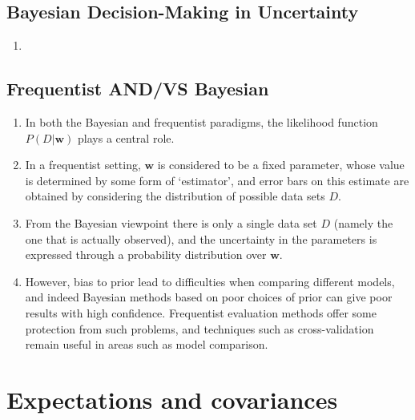 \subsection{Bayesian Decision-Making in Uncertainty}

\begin{enumerate}
    \item 
\end{enumerate}



\subsection{Frequentist AND/VS Bayesian}

\begin{enumerate}
    \item In both the Bayesian and frequentist paradigms, the likelihood function $P(D|\bm{w})$ plays a central role.
    \hfill \cite{ml/book/Pattern-Recognition-And-Machine-Learning/Christopher-M-Bishop}

    \item In a frequentist setting, $\bm{w}$ is considered to be a fixed parameter, whose value is determined by some form of ‘estimator’, and error bars on this estimate are obtained by considering the distribution of possible data sets $D$.
    \hfill \cite{ml/book/Pattern-Recognition-And-Machine-Learning/Christopher-M-Bishop}

    \item From the Bayesian viewpoint there is only a single data set $D$ (namely the one that is actually observed), and the uncertainty in the parameters is expressed through a probability distribution over $\bm{w}$.
    \hfill \cite{ml/book/Pattern-Recognition-And-Machine-Learning/Christopher-M-Bishop}

    \item However, bias to prior lead to difficulties when comparing different models, and indeed Bayesian methods based on poor choices of prior can give poor results with high confidence.
    Frequentist evaluation methods offer some protection from such problems, and techniques such as cross-validation remain useful in areas such as model comparison.
    \hfill \cite{ml/book/Pattern-Recognition-And-Machine-Learning/Christopher-M-Bishop}
\end{enumerate}








\section{Expectations and covariances}

